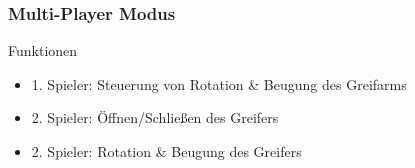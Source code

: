 \begin{frame}
\frametitle{Multi-Player Modus}
\begin{block}{Funktionen}
\begin{itemize}
\item 1. Spieler: Steuerung von Rotation \& Beugung des Greifarms
\item 2. Spieler: Öffnen/Schließen des Greifers
\item 2. Spieler: Rotation \& Beugung des Greifers
\end{itemize}
\end{block}
\end{frame}